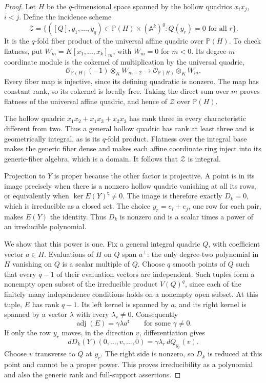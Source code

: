 \documentclass[11pt]{article}
\theoremstyle{definition}
\theoremstyle{remark}
\numberwithin{equation}{section}
\newcommand{\PP}{\mathbb P}
\newcommand{\OO}{\mathcal O}
\begin{document}
\begin{proof}
Let $H$ be the $q$-dimensional space spanned by the hollow quadrics
$x_i x_j$, $i<j$. Define the incidence scheme
\[
 \mathcal Z=
 \{([Q],y_1,\ldots,y_q)\in\PP(H)\times(\mathbb A^k)^q:
                         Q(y_r)=0\text{ for all }r\}.
\]
It is the $q$-fold fiber product of the universal affine quadric
over $\PP(H)$. To check flatness, put
$W_m=K[x_1,\ldots,x_k]_m$, with $W_m=0$ for $m<0$.
Its degree-$m$ coordinate module is the cokernel of multiplication
by the universal quadric,
\[
 \OO_{\PP(H)}(-1)\otimes_K W_{m-2}
 \longrightarrow \OO_{\PP(H)}\otimes_K W_m.
\]
Every fiber map is injective, since its defining quadratic is nonzero.
The map has constant rank, so its cokernel is locally free. Taking
the direct sum over $m$ proves flatness of the universal affine
quadric, and hence of $\mathcal Z$ over $\PP(H)$.

The hollow quadric $x_1x_2+x_1x_3+x_2x_3$ has rank three in every
characteristic different from two. Thus a general hollow quadric
has rank at least three and is geometrically integral, as is its
$q$-fold product. Flatness over the integral base makes the generic
fiber dense and makes each affine coordinate ring inject into its
generic-fiber algebra, which is a domain. It follows that
$\mathcal Z$ is integral.

Projection to $Y$ is proper because the other factor is projective.
A point is in its image precisely when there is a nonzero hollow
quadric vanishing at all its rows, or equivalently when
$\ker E(Y)^{\mathsf t}\ne0$. The image is therefore exactly $D_k=0$,
which is irreducible as a closed set. The choice $y_r=e_i+e_j$,
one row for each pair, makes $E(Y)$ the identity. Thus $D_k$ is
nonzero and is a scalar times a power of an irreducible polynomial.

We show that this power is one. Fix a general integral quadric $Q$,
with coefficient vector $a\in H$. Evaluations of $H$ on $Q$ span
$a^\perp$: the only degree-two polynomial in $H$ vanishing on $Q$
is a scalar multiple of $Q$. Choose $q$ smooth points of $Q$ such
that every $q-1$ of their evaluation vectors are independent.
Such tuples form a nonempty open subset of the irreducible product
$V(Q)^q$, since each of the finitely many independence conditions
holds on a nonempty open subset. At this tuple, $E$ has rank $q-1$.
Its left kernel is spanned by $a$, and its right kernel is spanned
by a vector $\lambda$ with every $\lambda_r\ne0$. Consequently
\[
 \operatorname{adj}(E)=\gamma\lambda a^{\mathsf t}
 \qquad\text{for some }\gamma\ne0.
\]
If only the row $y_r$ moves, in the direction $v$, differentiation gives
\[
 dD_k(Y)(0,\ldots,v,\ldots,0)
       =\gamma\lambda_r\,dQ_{y_r}(v).
\]
Choose $v$ transverse to $Q$ at $y_r$. The right side is nonzero,
so $D_k$ is reduced at this point and cannot be a proper power.
This proves irreducibility as a polynomial and also the generic
rank and full-support assertions.


\end{proof}
\end{document}
